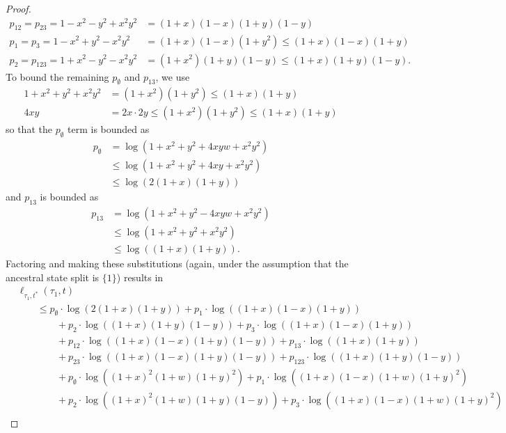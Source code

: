 \begin{proof}
\begin{align*}
p_{12} = p_{23} = 1-x^2-y^2+x^2y^2 & = (1+x)(1-x)(1+y)(1-y) \\
p_{1} = p_{3} = 1-x^2+y^2-x^2y^2 & = (1+x)(1-x)(1+y^2) \le (1+x)(1-x)(1+y) \\
p_{2} = p_{123} = 1+x^2-y^2-x^2y^2 & = (1+x^2)(1+y)(1-y) \le (1+x)(1+y)(1-y).
\end{align*}
To bound the remaining $p_{\emptyset}$ and $p_{13}$, we use
\begin{align*}
1+x^2+y^2+x^2y^2 & = (1+x^2)(1+y^2) \le (1+x)(1+y) \\
4xy & = 2x \cdot 2y \le (1+x^2)(1+y^2) \le (1+x)(1+y)
\end{align*}
so that the $p_{\emptyset}$ term is bounded as
\begin{align*}
    p_{\emptyset} & = \log(1+x^2+y^2+4xyw+x^2y^2) \\
                  & \le \log(1+x^2+y^2+4xy+x^2y^2) \\
                  & \le \log(2(1+x)(1+y))
\end{align*}
and $p_{13}$ is bounded as
\begin{align*}
    p_{13} & = \log(1+x^2+y^2-4xyw+x^2y^2) \\
                  & \le \log(1+x^2+y^2+x^2y^2) \\
                  & \le \log((1+x)(1+y)).
\end{align*}
Factoring and making these substitutions (again, under the assumption that the ancestral state split is $\{1\}$) results in
\begin{align*}
&    \ell_{\tau_1,t^*}(\tau_1, t) \\
&\qquad \le      p_{\emptyset}  \cdot\log(2(1+x)(1+y))
+ p_{1}          \cdot\log((1+x)(1-x)(1+y)) \\
    &\qquad\qquad + p_{2}          \cdot\log((1+x)(1+y)(1-y))
+ p_{3}          \cdot\log((1+x)(1-x)(1+y)) \\
    &\qquad\qquad + p_{12}         \cdot\log((1+x)(1-x)(1+y)(1-y))
+ p_{13}         \cdot\log((1+x)(1+y)) \\
    &\qquad\qquad + p_{23}         \cdot\log((1+x)(1-x)(1+y)(1-y))
+ p_{123}        \cdot\log((1+x)(1+y)(1-y)) \\
    &\qquad\qquad + p_{\emptyset}  \cdot\log((1+x)^2   (1+w)(1+y)^2)
+ p_{1}          \cdot\log((1+x)(1-x)(1+w)(1+y)^2) \\
    &\qquad\qquad + p_{2}          \cdot\log((1+x)^2   (1+w)(1+y)(1-y))
+ p_{3}          \cdot\log((1+x)(1-x)(1+w)(1+y)^2) \\

\end{align*}
\end{proof}
